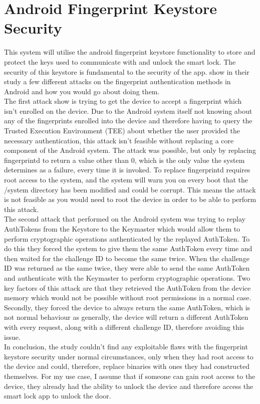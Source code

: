 \section{Android Fingerprint Keystore Security}
This system will utilise the android fingerprint keystore functionality to store and protect the keys used to communicate with and unlock the smart lock. The security of this keystore is fundamental to the security of the app. \cite{Does2016} show in their study a few different attacks on the fingerprint authentication methods in Android and how you would go about doing them.
\\
\indent The first attack \cite{Does2016} show is trying to get the device to accept a fingerprint which isn't enrolled on the device. Due to the Android system itself not knowing about any of the fingerprints enrolled into the device and therefore having to query the Trusted Execution Environment (TEE) about whether the user provided the necessary authentication, this attack isn't feasible without replacing a core component of the Android system. The attack was possible, but only by replacing fingerprintd to return a value other than 0, which is the only value the system determines as a failure, every time it is invoked. To replace fingerprintd requires root access to the system, and the system will warn you on every boot that the /system directory has been modified and could be corrupt. This means the attack is not feasible as you would need to root the device in order to be able to perform this attack.
\\
\indent The second attack that \cite{Does2016} performed on the Android system was trying to replay AuthTokens from the Keystore to the Keymaster which would allow them to perform cryptographic operations authenticated by the replayed AuthToken. To do this they forced the system to give them the same AuthToken every time and then waited for the challenge ID to become the same twice. When the challenge ID was returned as the same twice, they were able to send the same AuthToken and authenticate with the Keymaster to perform cryptographic operations. Two key factors of this attack are that they retrieved the AuthToken from the device memory which would not be possible without root permissions in a normal case. Secondly, they forced the device to always return the same AuthToken, which is not normal behaviour as generally, the device will return a different AuthToken with every request, along with a different challenge ID, therefore avoiding this issue.
\\
\indent In conclusion, the study couldn't find any exploitable flaws with the fingerprint keystore security under normal circumstances, only when they had root access to the device and could, therefore, replace binaries with ones they had constructed themselves. For my use case, I assume that if someone can gain root access to the device, they already had the ability to unlock the device and therefore access the smart lock app to unlock the door.